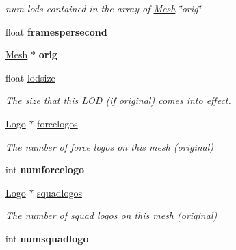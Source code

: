 \begin{DoxyCompactItemize}
\begin{DoxyCompactList}\small\item\em num lods contained in the array of \hyperlink{classMesh}{Mesh} \char`\"{}orig\char`\"{} \end{DoxyCompactList}\item 
float {\bfseries framespersecond}\hypertarget{classMesh_aa577847fb070abd830409a49e2f921b9}{}\label{classMesh_aa577847fb070abd830409a49e2f921b9}

\item 
\hyperlink{classMesh}{Mesh} $\ast$ {\bfseries orig}\hypertarget{classMesh_a05a2cbf492a0b3ed0e3b6afa871c29bf}{}\label{classMesh_a05a2cbf492a0b3ed0e3b6afa871c29bf}

\item 
float \hyperlink{classMesh_a03b98855f11eafecf30d12b253d4ffba}{lodsize}\hypertarget{classMesh_a03b98855f11eafecf30d12b253d4ffba}{}\label{classMesh_a03b98855f11eafecf30d12b253d4ffba}

\begin{DoxyCompactList}\small\item\em The size that this L\+OD (if original) comes into effect. \end{DoxyCompactList}\item 
\hyperlink{classLogo}{Logo} $\ast$ \hyperlink{classMesh_a8b12c305411ca924fa4ac8e6cae140ed}{forcelogos}\hypertarget{classMesh_a8b12c305411ca924fa4ac8e6cae140ed}{}\label{classMesh_a8b12c305411ca924fa4ac8e6cae140ed}

\begin{DoxyCompactList}\small\item\em The number of force logos on this mesh (original) \end{DoxyCompactList}\item 
int {\bfseries numforcelogo}\hypertarget{classMesh_a13aa2b4ffb4550d9a262cddb3a986916}{}\label{classMesh_a13aa2b4ffb4550d9a262cddb3a986916}

\item 
\hyperlink{classLogo}{Logo} $\ast$ \hyperlink{classMesh_aaa5038a1eaa7449aaf53e3fa19457642}{squadlogos}\hypertarget{classMesh_aaa5038a1eaa7449aaf53e3fa19457642}{}\label{classMesh_aaa5038a1eaa7449aaf53e3fa19457642}

\begin{DoxyCompactList}\small\item\em The number of squad logos on this mesh (original) \end{DoxyCompactList}\item 
int {\bfseries numsquadlogo}\hypertarget{classMesh_a02a0fe97270d8aadece6c731347f5fe2}{}\label{classMesh_a02a0fe97270d8aadece6c731347f5fe2}


\end{DoxyCompactItemize}
